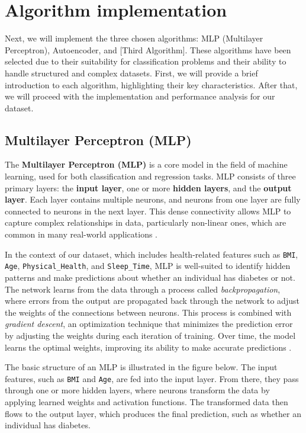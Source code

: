 \section{Algorithm implementation}
Next, we will implement the three chosen algorithms: MLP (Multilayer Perceptron), Autoencoder, and [Third Algorithm]. These algorithms have been selected due to their suitability for classification problems and their ability to handle structured and complex datasets. First, we will provide a brief introduction to each algorithm, highlighting their key characteristics. After that, we will proceed with the implementation and performance analysis for our dataset.

\subsection{Multilayer Perceptron (MLP)}

The \textbf{Multilayer Perceptron (MLP)} is a core model in the field of machine learning, used for both classification and regression tasks. MLP consists of three primary layers: the \textbf{input layer}, one or more \textbf{hidden layers}, and the \textbf{output layer}. Each layer contains multiple neurons, and neurons from one layer are fully connected to neurons in the next layer. This dense connectivity allows MLP to capture complex relationships in data, particularly non-linear ones, which are common in many real-world applications \cite{deeplearning1}.

In the context of our dataset, which includes health-related features such as \texttt{BMI}, \texttt{Age}, \texttt{Physical\_Health}, and \texttt{Sleep\_Time}, MLP is well-suited to identify hidden patterns and make predictions about whether an individual has diabetes or not. The network learns from the data through a process called \textit{backpropagation}, where errors from the output are propagated back through the network to adjust the weights of the connections between neurons. This process is combined with \textit{gradient descent}, an optimization technique that minimizes the prediction error by adjusting the weights during each iteration of training. Over time, the model learns the optimal weights, improving its ability to make accurate predictions \cite{nn1}.

The basic structure of an MLP is illustrated in the figure below. The input features, such as \texttt{BMI} and \texttt{Age}, are fed into the input layer. From there, they pass through one or more hidden layers, where neurons transform the data by applying learned weights and activation functions. The transformed data then flows to the output layer, which produces the final prediction, such as whether an individual has diabetes.

